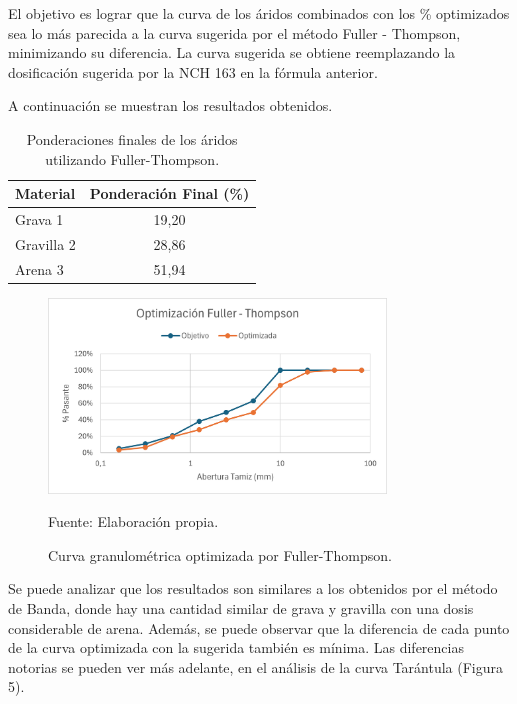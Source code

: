 El objetivo es lograr que la curva de los áridos combinados con los \% optimizados sea lo más parecida a la curva sugerida por el método Fuller - Thompson, minimizando su diferencia. La curva sugerida se obtiene reemplazando la dosificación sugerida por la NCH 163 en la fórmula anterior.  

A continuación se muestran los resultados obtenidos.

\begin{table}[H]
\centering
\caption{Ponderaciones finales de los áridos utilizando Fuller-Thompson.}
\begin{tabular}{|l|c|}
\hline
\textbf{Material} & \textbf{Ponderación Final (\%)} \\ \hline
Grava 1     & 19,20 \\ \hline
Gravilla 2  & 28,86 \\ \hline
Arena 3     & 51,94 \\ \hline
\end{tabular}
\end{table}

\begin{figure}[H]
    \centering
    \includegraphics[width=0.8\textwidth]{GRAFICOS/fuller_thompson.png}
    \caption{Curva granulométrica optimizada por Fuller-Thompson.}
    Fuente: Elaboración propia.
\end{figure}

Se puede analizar que los resultados son similares a los obtenidos por el método de Banda, donde hay una cantidad similar de grava y gravilla con una dosis considerable de arena. Además, se puede observar que la diferencia de cada punto de la curva optimizada con la sugerida también es mínima. Las diferencias notorias se pueden ver más adelante, en el análisis de la curva Tarántula (Figura 5).


